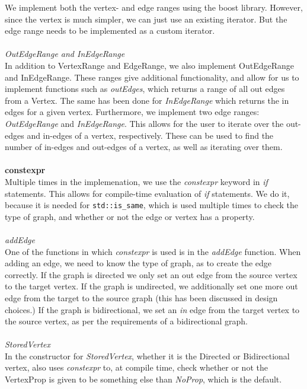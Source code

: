\documentclass{article}
\begin{document}
We implement both the vertex- and edge ranges using the boost library. However, since the vertex is much simpler, we can just use an existing iterator. But the edge range needs to be implemented as a custom iterator.
\\\\
\textit{OutEdgeRange and InEdgeRange}\\
In addition to VertexRange and EdgeRange, we also implement OutEdgeRange and InEdgeRange. These ranges give additional functionality, and allow for us to implement functions such as \textit{outEdges}, which returns a range of all out edges from a Vertex. The same has been done for \textit{InEdgeRange} which returns the in edges for a given vertex. 
Furthermore, we implement two edge ranges: \textit{OutEdgeRange} and \textit{InEdgeRange}. This allows for the user to iterate over the out-edges and in-edges of a vertex, respectively. These can be used to find the number of in-edges and out-edges of a vertex, as well as iterating over them. 
\\\\
\noindent
\textbf{constexpr}\\
\noindent
Multiple times in the implemenation, we use the \textit{constexpr} keyword in \textit{if} statements. This allows for compile-time evaluation of \textit{if} statements. 
We do it, because it is needed for \texttt{std::is\_same}, which is used multiple times to check the type of graph, and whether or not the edge or vertex has a property. 
\\\\
\noindent
\textit{addEdge}\\
\noindent
One of the functions in which \textit{constexpr} is used is in the \textit{addEdge} function. 
When adding an edge, we need to know the type of graph, as to create the edge correctly. If the graph is directed we only set an out edge from the source vertex to the target vertex. If the graph is undirected, we additionally set one more out edge from the target to the source graph (this has been discussed in design choices.) If the graph is bidirectional, we set an \textit{in} edge from the target vertex to the source vertex, as per the requirements of a bidirectional graph.
\\\\
\noindent
\textit{StoredVertex}\\
\noindent
In the constructor for \textit{StoredVertex}, whether it is the Directed or Bidirectional vertex, also uses \textit{constexpr} to, at compile time, check whether or not the VertexProp is given to be something else than \textit{NoProp}, which is the default. 
\end{document}
